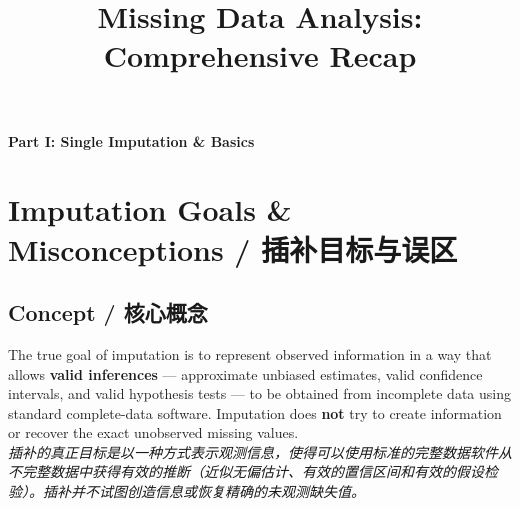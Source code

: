 \documentclass[9pt, a4paper]{article}
\title{\textbf{Missing Data Analysis: Comprehensive Recap}}
\begin{document}
\maketitle
\thispagestyle{empty}
\tableofcontents
\newpage

\begin{center}
    \Large \textbf{Part I: Single Imputation \& Basics}
\end{center}

\section{Imputation Goals \& Misconceptions / 插补目标与误区}

\subsection{Concept / 核心概念}
\begin{tcolorbox}[defbox]
    The true goal of imputation is to represent observed information in a way that allows \textbf{valid inferences} --- approximate unbiased estimates, valid confidence intervals, and valid hypothesis tests --- to be obtained from incomplete data using standard complete-data software. Imputation does \textbf{not} try to create information or recover the exact unobserved missing values.\\
    \textit{插补的真正目标是以一种方式表示观测信息，使得可以使用标准的完整数据软件从不完整数据中获得有效的推断（近似无偏估计、有效的置信区间和有效的假设检验）。插补并不试图创造信息或恢复精确的未观测缺失值。}
\end{tcolorbox}
\end{document}
